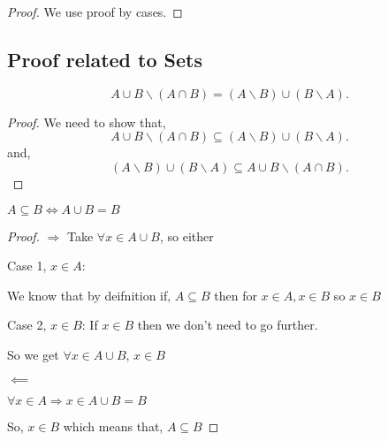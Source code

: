 \begin{proof}
    We use proof by cases.
    
\end{proof}


\subsection*{Proof related to Sets}
\begin{theorem}
    \[
    A \cup B \backslash (A \cap B) = (A \backslash B) \cup (B \backslash A)
    .\] 

\end{theorem}

\begin{proof}
    We need to show that, \[
 A \cup B \backslash (A \cap B) \subseteq  (A \backslash B) \cup (B \backslash A)
    .\] 
    and,
  \[
  (A \backslash B) \cup (B \backslash A) \subseteq A \cup B \backslash (A \cap B) 
  .\] 
\end{proof}



\begin{theorem}
    $A \subseteq B \iff A \cup B = B$
\end{theorem}

 \begin{proof}
    $\Rightarrow$   
    Take $\forall x \in A \cup B$, so either
    
    Case 1, $x \in A$:

    We know that by deifnition if, $A \subseteq B$ then for  $x \in A, x \in B$ so  $x \in B$
    
    Case 2, $x \in B$:
    If $x \in B$ then we don't need to go further.


    So we get $\forall x \in A \cup B$,  $x \in B$

    $\impliedby$

    $\forall x \in A \Rightarrow x \in A \cup B = B$

    So,  $x \in B$ which means that, $A \subseteq B$
    
\end{proof}



